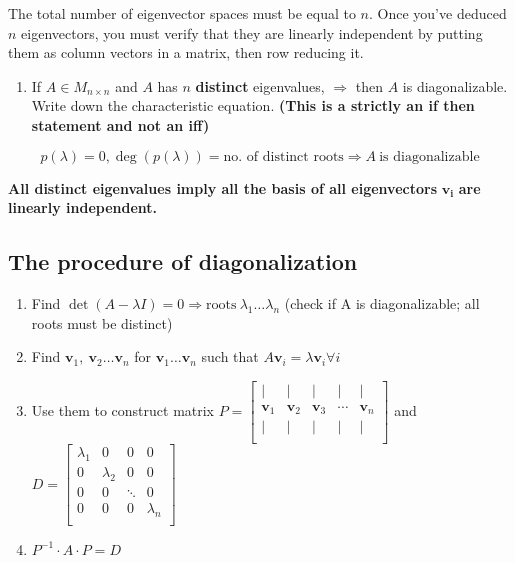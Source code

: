 \documentclass[
]{article}
\begin{document}
The total number of eigenvector spaces must be equal to $n$. Once
you've deduced $n$ eigenvectors, you must verify that they are
linearly independent by putting them as column vectors in a matrix, then
row reducing it.

\begin{enumerate}
\def\labelenumi{\arabic{enumi}.}
\setcounter{enumi}{1}
\item
  If $A \in M_{n \times n}$ and $A$ has $n$ \textbf{distinct}
  eigenvalues, $\Rightarrow$ then $A$ is diagonalizable. Write down
  the characteristic equation. \textbf{(This is a strictly an if then
  statement and not an iff)}
\end{enumerate}

$$p(\lambda) = 0,\deg\left( p(\lambda) \right) = \text{no.\ of\ distinct\ roots} \Rightarrow A\ \text{is\ diagonalizable}$$

\textbf{All distinct eigenvalues imply all the basis of all
eigenvectors} ${\mathbf{\mathbf{v}}}_{\mathbf{i}}$ \textbf{are
linearly independent.}


\subsection{The procedure of
diagonalization}

\begin{enumerate}
\def\labelenumi{\arabic{enumi}.}
\item
  Find
  $\det(A - \lambda I) = 0 \Rightarrow \text{roots}\ \lambda_{1}\ldots\lambda_{n}$
  (check if $\text{A\ }$is diagonalizable; all roots must be distinct)
\item
  Find
  ${\mathbf{v}}_{1},\ {\mathbf{v}}_{2}\ldots{\mathbf{v}}_{n}$
  for ${\mathbf{v}}_{1}\ldots{\mathbf{v}}_{n}$ such that
  $A{\mathbf{v}}_{i} = \lambda{\mathbf{v}}_{i}\forall i$
\item
  Use them to construct matrix $P = \begin{bmatrix}
   \mid & \mid & \mid & \mid & \mid \\
  {\mathbf{v}}_{1} & {\mathbf{v}}_{2} & {\mathbf{v}}_{3} & \cdots & {\mathbf{v}}_{n} \\
   \mid & \mid & \mid & \mid & \mid \\
  \end{bmatrix}$ and $D = \begin{bmatrix}
  \lambda_{1} & 0 & 0 & 0 \\
  0 & \lambda_{2} & 0 & 0 \\
  0 & 0 & \ddots & 0 \\
  0 & 0 & 0 & \lambda_{n} \\
  \end{bmatrix}$
\item
  $P^{- 1} \cdot A \cdot P = D$
\end{enumerate}
\end{document}
